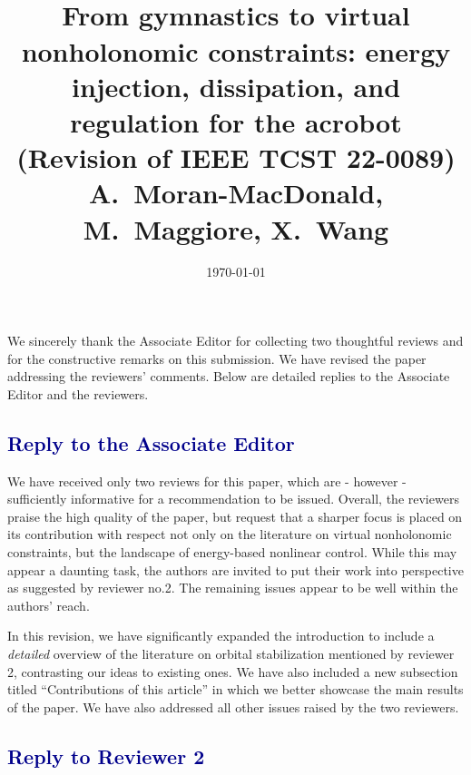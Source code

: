 \documentclass[11pt,letter]{article}
\title{\vspace{-1cm} {\Large \bf \color{darkblue}{Reply to the Associate
      Editor and Reviewers}\\[0.6cm] \large {\bf From gymnastics to virtual nonholonomic constraints: energy
injection, dissipation, and regulation for the acrobot
      }\\[0.2cm] {(Revision of  IEEE TCST 22-0089)\\ A.~Moran-MacDonald, M.~Maggiore, X.~Wang}}} \author{}
\date{\today}
\newenvironment{myquote}{%
\bigskip%
\begin{tcolorbox}[]\footnotesize}{%
\end{tcolorbox}%
\bigskip}
\newcommand{\drawline}
{   \hspace*{-\marginparsep minus \marginparwidth}
	\begin{minipage}[t]{\textwidth+\marginparwidth+\marginparsep}%
		{\large \bfseries {} \hfill {}}\\[-0.15\baselineskip]%
		\textcolor{LineColor}{\rule{\columnwidth}{2 pt}}%
	\end{minipage}}
\begin{document}
\vspace{-4cm}
\maketitle

{}

\indent We sincerely thank the Associate Editor for collecting two thoughtful reviews and for the 
constructive remarks on this submission. We have revised the paper addressing the reviewers'
comments. Below are detailed replies to the Associate Editor and the reviewers.
\subsection*{\textcolor{darkblue}{Reply to the Associate Editor}} 
\vspace{0cm}



\begin{myquote}
We have received only two reviews for this paper, which are - however -
sufficiently informative for a recommendation  to be  issued. Overall,
the reviewers praise the high quality of the paper, but request that a
sharper focus is placed on its contribution with respect not only on
the literature on virtual nonholonomic constraints, but the  landscape
of energy-based nonlinear control. While this may appear a daunting
task, the authors are invited to put their work into perspective as
suggested by reviewer no.2.  The remaining issues appear to be well
within the authors' reach.  
\end{myquote}

In this revision, we have significantly expanded the introduction to include a \emph{detailed} overview of the literature on orbital stabilization mentioned by reviewer 2, contrasting our ideas to existing ones. We have also included a new subsection titled ``Contributions of this article'' in which we better showcase the main results of the paper.  We have also addressed all other issues raised by the two reviewers.


\newpage
\vspace{0.2cm}
\subsection*{\textcolor{darkblue}{Reply to Reviewer 2}} 
\vspace{0.2cm}
\end{document}
